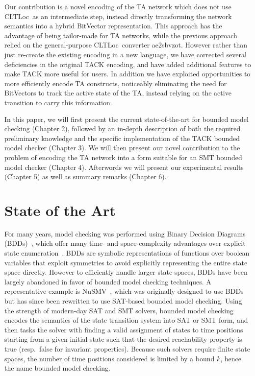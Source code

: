 \documentclass[a4paper,11pt]{report}
\theoremstyle{definition}
\newcommand{\cltloc}{CLTLoc}
\newcommand{\aez}{ae2sbvzot}
\begin{document}
Our contribution is a novel encoding of the TA network which does not use
\cltloc\ as an intermediate step, instead directly transforming the network
semantics into a hybrid BitVector representation. This approach has the
advantage of being tailor-made for TA networks, while the previous approach
relied on the general-purpose \cltloc\ converter \aez. However rather than just
re-create the existing encoding in a new language, we have corrected several
deficiencies in the original TACK encoding, and have added additional features
to make TACK more useful for users. In addition we have exploited opportunities
to more efficiently encode TA constructs, noticeably eliminating the need for
BitVectors to track the active state of the TA, instead relying on the active
transition to carry this information.

In this paper, we will first present the current state-of-the-art for bounded
model checking (Chapter 2), followed by an in-depth description of both the required
preliminary knowledge and the specific implementation of the TACK bounded model
checker (Chapter 3). We will then present our novel contribution to the problem
of encoding the TA network into a form suitable for an SMT bounded model checker
(Chapter 4). Afterwords we will present our experimental results (Chapter 5) as
well as summary remarks (Chapter 6).

\chapter{State of the Art}\label{stateoftheart}


For many years, model checking was performed using Binary Decision Diagrams
(BDDs)~\cite{bryant86}, which offer many time- and space-complexity advantages
over explicit state enumeration~\cite{burch92}. BDDs are symbolic
representations of functions over boolean variables that exploit symmetries to
avoid explicitly representing the entire state space directly. However to
efficiently handle larger state spaces, BDDs have been largely abandoned in
favor of bounded model checking techniques. A representative example is
NuSMV~\cite{cimatti02}, which was originally designed to use BDDs but has since
been rewritten to use SAT-based bounded model checking. Using the strength of
modern-day SAT and SMT solvers, bounded model checking encodes the semantics of
the state transition system into SAT or SMT form, and then tasks the solver with
finding a valid assignment of states to time positions starting from a given
initial state such that the desired reachability property is true (resp.\ false
for invariant properties). Because such solvers require finite state spaces, the
number of time positions considered is limited by a bound $k$, hence the name
bounded model checking.
\end{document}
